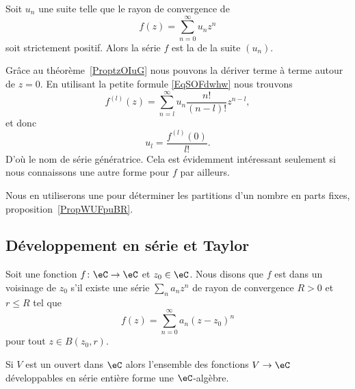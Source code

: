 Soit \( u_n\) une suite telle que le rayon de convergence de
\begin{equation}
    f(z)=\sum_{n=0}^{\infty}u_nz^n
\end{equation}
soit strictement positif. Alors la série \( f\) est la  de la suite \( (u_n)\).

Grâce au théorème~\ref{ProptzOIuG} nous pouvons la dériver terme à terme autour de \( z=0\). En utilisant la petite formule \eqref{EqSOFdwhw} nous trouvons
\begin{equation}    \label{EqNGhVCpP}
    f^{(l)}(z)=\sum_{n=l}^{\infty}u_n\frac{ n! }{ (n-l)! }z^{n-l},
\end{equation}
et donc
\begin{equation}
    u_l=\frac{ f^{(l)}(0) }{ l! }.
\end{equation}
D'où le nom de série génératrice. Cela est évidemment intéressant seulement si nous connaissons une autre forme pour \( f\) par ailleurs.

Nous en utiliserons une pour déterminer les partitions d'un nombre en parts fixes, proposition~\ref{PropWUFpuBR}.

\subsection{Développement en série et Taylor}

\begin{definition}  \label{DefwmRzKh}
    Soit une fonction \( f\colon \eC\to \eC\) et \( z_0\in \eC\). Nous disons que \( f\) est  dans un voisinage de \( z_0\) s'il existe une série \( \sum_n a_nz^n\) de rayon de convergence \( R>0\) et \( r\leq R\) tel que
    \begin{equation}
        f(z)=\sum_{n=0}^{\infty}a_n(z-z_0)^n
    \end{equation}
    pour tout \( z\in B(z_0,r)\).
\end{definition}

\begin{proposition}
    Si \( V\) est un ouvert dans \( \eC\) alors l'ensemble des fonctions \( V\to \eC\) développables en série entière forme une \( \eC\)-algèbre.
\end{proposition}


